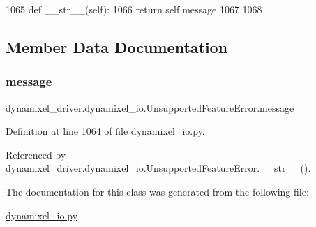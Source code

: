 \begin{DoxyCode}
1065     \textcolor{keyword}{def }\_\_str\_\_(self):
1066         \textcolor{keywordflow}{return} self.message
1067 
1068 \end{DoxyCode}


\subsection{Member Data Documentation}
\mbox{\label{classdynamixel__driver_1_1dynamixel__io_1_1_unsupported_feature_error_a2d5aa0c4ec2bc2509837759ca9b021bd}} 
\subsubsection{\texorpdfstring{message}{message}}
{\footnotesize\ttfamily dynamixel\+\_\+driver.\+dynamixel\+\_\+io.\+Unsupported\+Feature\+Error.\+message}



Definition at line 1064 of file dynamixel\+\_\+io.\+py.



Referenced by dynamixel\+\_\+driver.\+dynamixel\+\_\+io.\+Unsupported\+Feature\+Error.\+\_\+\+\_\+str\+\_\+\+\_\+().



The documentation for this class was generated from the following file\+:\begin{DoxyCompactItemize}
\item 
\hyperlink{dynamixel__io_8py}{dynamixel\+\_\+io.\+py}\end{DoxyCompactItemize}
